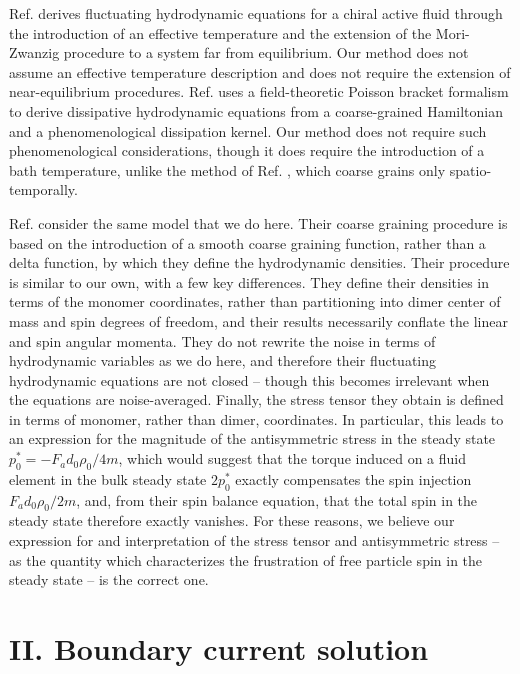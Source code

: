 \documentclass[%
 reprint,
superscriptaddress,
longbibliography,
 amsmath,amssymb,
 prl,
 citeautoscript,
]{revtex4-1}
\begin{document}
Ref. \cite{Vitellis_pretty_pictures} derives fluctuating hydrodynamic equations for a chiral active fluid through the introduction of an effective temperature and the extension of the Mori-Zwanzig procedure to a system far from equilibrium. Our method does not assume an effective temperature description and does not require the extension of near-equilibrium procedures. Ref. \cite{Lubensky_PB} uses a field-theoretic Poisson bracket formalism to derive dissipative hydrodynamic equations from a coarse-grained Hamiltonian and a phenomenological dissipation kernel. Our method does not require such phenomenological considerations, though it does require the introduction of a bath temperature, unlike the method of Ref. \cite{Lubensky_PB}, which coarse grains only spatio-temporally.

Ref. \cite{Kranthi_hydro_eqns, Kranthi1, Cory_MD} consider the same model that we do here. Their coarse graining procedure is based on the introduction of a smooth coarse graining function, rather than a delta function, by which they define the hydrodynamic densities. Their procedure is similar to our own, with a few key differences. They define their densities in terms of the monomer coordinates, rather than partitioning into dimer center of mass and spin degrees of freedom, and their results necessarily conflate the linear and spin angular momenta. They do not rewrite the noise in terms of hydrodynamic variables as we do here, and therefore their fluctuating hydrodynamic equations are not closed -- though this becomes irrelevant when the equations are noise-averaged. Finally, the stress tensor they obtain is defined in terms of monomer, rather than dimer, coordinates. In particular, this leads to an expression for the magnitude of the antisymmetric stress in the steady state $p^*_0 = - F_a d_0 \rho_0 / 4 m$, which would suggest that the torque induced on a fluid element in the bulk steady state $2 p_0^*$ exactly compensates the spin injection $F_a d_0 \rho_0 / 2m$, and, from their spin balance equation, that the total spin in the steady state therefore exactly vanishes. For these reasons, we believe our expression for and interpretation of the stress tensor and antisymmetric stress -- as the quantity which characterizes the frustration of free particle spin in the steady state -- is the correct one.

\section{II. Boundary current solution}
\end{document}
